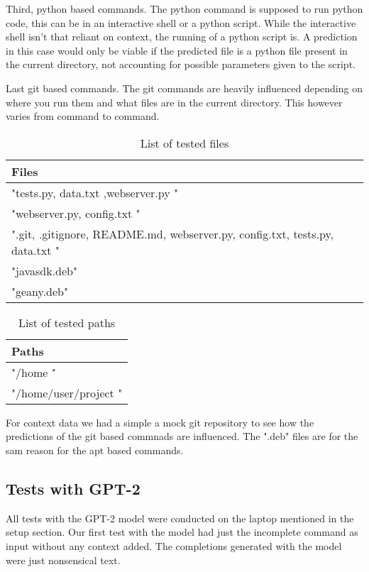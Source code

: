 Third, python based commands. The python command is supposed to run python code, this can be in an interactive shell or a python script. While the interactive shell isn't that reliant on context, the running of a python script is. A prediction in this case would only be viable if the predicted file is a python file present in the current directory, not accounting for possible parameters given to the script.



Last git based commands. The git commands are heavily influenced depending on where you run them and what files are in the current directory. This however varies from command to command.




\begin{table}[ht]
\centering
\begin{tabular}{|l|}
\hline
\textbf{Files} \\
\hline
"tests.py, data.txt ,webserver.py " \\
"webserver.py, config.txt " \\
".git, .gitignore, README.md, webserver.py, config.txt, tests.py, data.txt " \\
"javasdk.deb"\\
"geany.deb"\\
\hline
\end{tabular}
\caption{List of tested files}
\end{table}

\begin{table}[ht]
\centering
\begin{tabular}{|l|}
\hline
\textbf{Paths} \\
\hline
"/home " \\
"/home/user/project " \\
\hline
\end{tabular}
\caption{List of tested paths}
\end{table}

For context data we had a simple a mock git repository to see how the predictions of the git based commnads are influenced. The ".deb" files are for the sam reason for the apt based commands.




\pagebreak
\subsection{Tests with GPT-2}\raggedbottom

All tests with the GPT-2 model were conducted on the laptop mentioned in the setup section.
Our first test with the model had just the incomplete command as input without any context added. The completions generated with the model were just nonsensical text.




